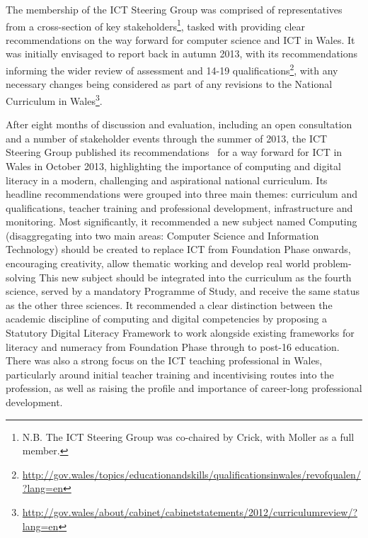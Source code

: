 \documentclass{sig-alternate}
\begin{document}
The membership of the ICT Steering Group was comprised of
representatives from a cross-section of key
stakeholders\footnote{N.B. The ICT Steering Group was co-chaired by
Crick, with Moller as a full member.}, tasked with providing clear
recommendations on the way forward for computer science and ICT in
Wales. It was initially envisaged to report back in autumn 2013, with
its recommendations informing the wider review of assessment and 14-19
qualifications\footnote{\url{http://gov.wales/topics/educationandskills/qualificationsinwales/revofqualen/?lang=en}},
with any necessary changes being considered as part of any revisions
to the National Curriculum in
Wales\footnote{\url{http://gov.wales/about/cabinet/cabinetstatements/2012/curriculumreview/?lang=en}}.

After eight months of discussion and evaluation, including an open
consultation and a number of stakeholder events through the summer of
2013, the ICT Steering Group published its
recommendations~\cite{welshictreview:2013} for a way forward for ICT
in Wales in October 2013, highlighting the importance of computing and
digital literacy in a modern, challenging and aspirational national
curriculum. Its headline recommendations were grouped into three main
themes: curriculum and qualifications, teacher training and
professional development, infrastructure and monitoring. Most
significantly, it recommended a new subject named Computing
(disaggregating into two main areas: Computer Science and Information
Technology) should be created to replace ICT from Foundation Phase
onwards, encouraging creativity, allow thematic working and develop
real world problem-solving This new subject should be integrated into
the curriculum as the fourth science, served by a mandatory Programme
of Study, and receive the same status as the other three sciences. It
recommended a clear distinction between the academic discipline of
computing and digital competencies by proposing a Statutory Digital
Literacy Framework to work alongside existing frameworks for literacy
and numeracy from Foundation Phase through to post-16 education. There
was also a strong focus on the ICT teaching professional in Wales,
particularly around initial teacher training and incentivising routes
into the profession, as well as raising the profile and importance of
career-long professional development.
\end{document}
